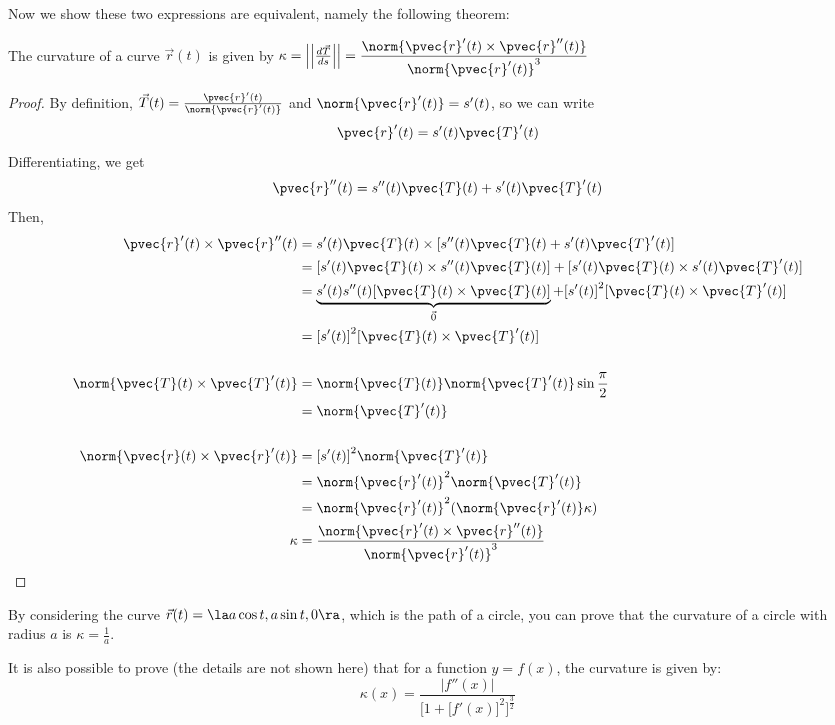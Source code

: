 \documentclass[12pt]{article}
\begin{document}
\begin{enumerate}
Now we show these two expressions are equivalent, namely the following theorem:

\begin{theorem}
The curvature of a curve $\vec{r}(t)$ is given by $\kappa = \left|\left|\frac{d\vec{T}}{ds}\right|\right| = \dfrac{\norm{\pvec{r}'(t) \times \pvec{r}''(t)}}{\norm{\pvec{r}'(t)}^3}$
\end{theorem}

\begin{proof}
By definition, $\vec{T}(t) = \frac{\pvec{r}'(t)}{\norm{\pvec{r}'(t)}}$ and $\norm{\pvec{r}'(t)} = s'(t)$, so we can write \[ \pvec{r}'(t) = s'(t)\pvec{T}'(t) \]
Differentiating, we get \[ \pvec{r}''(t) = s''(t)\pvec{T}(t) + s'(t)\pvec{T}'(t) \]
Then,
\[
\begin{aligned}
\pvec{r}'(t) \times \pvec{r}''(t) &= s'(t)\pvec{T}(t) \times {[}s''(t)\pvec{T}(t) + s'(t)\pvec{T}'(t){]} \\ 
&= {[}s'(t)\pvec{T}(t) \times s''(t)\pvec{T}(t){]} + {[}s'(t)\pvec{T}(t) \times s'(t)\pvec{T}'(t){]} \\
&= \underbrace{s'(t)s''(t){[}\pvec{T}(t) \times \pvec{T}(t){]}}_{\vec{0}} + {[}s'(t){]}^2{[}\pvec{T}(t) \times \pvec{T}'(t){]} \\
&= {[}s'(t){]}^2{[}\pvec{T}(t) \times \pvec{T}'(t){]} \\ \\
\norm{\pvec{T}(t) \times \pvec{T}'(t)} &= \norm{\pvec{T}(t)}\norm{\pvec{T}'(t)}\sin{\frac{\pi}{2}} \\
&= \norm{\pvec{T}'(t)} \\ \\
\norm{\pvec{r}(t) \times \pvec{r}'(t)} &= {[}s'(t){]}^2\norm{\pvec{T}'(t)} \\
&= \norm{\pvec{r}'(t)}^2\norm{\pvec{T}'(t)} \\
&= \norm{\pvec{r}'(t)}^2(\norm{\pvec{r}'(t)}\kappa) \\
\kappa &= \dfrac{\norm{\pvec{r}'(t) \times \pvec{r}''(t)}}{\norm{\pvec{r}'(t)}^3}
\end{aligned}
\]
\end{proof}

By considering the curve $\vec{r}(t) = \la a\cos{t}, a\sin{t}, 0 \ra$, which is the path of a circle, you can prove that the curvature of a circle with radius $a$ is $\kappa = \frac{1}{a}$.

It is also possible to prove (the details are not shown here) that for a function $y = f(x)$, the curvature is given by:
\[ \kappa(x) = \dfrac{|f''(x)|}{{[}1+{[}f'(x){]}^2{]}^{\frac{3}{2}}} \]


\end{enumerate}
\end{document}
